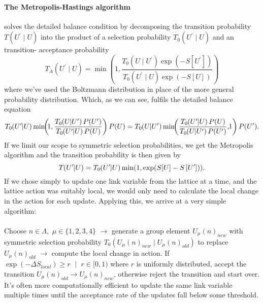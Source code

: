 \documentclass[a4paper,10pt]{book}
\begin{document}
\paragraph{The Metropolis-Hastings algorithm} solves the detailed balance condition by decomposing the transition probability $T\left(U^{\prime} \mid U\right)$ into the product of a selection probability $T_0\left(U^{\prime} \mid U\right)$ and an transition- acceptance probability
\begin{equation}
T_{A}\left(U^{\prime} \mid U\right)=\min \left(1, \frac{T_{0}\left(U \mid U^{\prime}\right) \exp \left(-S\left[U^{\prime}\right]\right)}{T_{0}\left(U^{\prime} \mid U\right) \exp (-S[U])}\right)
\end{equation}
where we've used the Boltzmann distribution in place of the more general probability distribution. Which, as we can see, fulfils the detailed balance equation
\begin{equation*}
T_0\mkern-4mu\left(U^{\prime}\mkern-6mu \mid\mkern-5mu U\right)\min\mkern-6mu \left(\mkern-4mu 1, \frac{T_0\mkern-4mu\left(U\mkern-6mu \mid\mkern-5mu U^{\prime}\right) P(U^\prime)}{T_0\mkern-4mu\left(U^{\prime}\mkern-6mu \mid\mkern-5mu U\right) P(U)}\right)P(U) = T_0\mkern-4mu\left(U\mkern-6mu \mid\mkern-5mu U^{\prime}\right)\min\mkern-6mu \left(\frac{T_0\mkern-4mu\left(U^{\prime}\mkern-6mu \mid\mkern-5mu U\right) P(U)}{T_0\mkern-4mu\left(U\mkern-6mu \mid\mkern-5mu U^{\prime}\right) P(U^{\prime})},\mkern-4mu 1\right)P(U^{\prime}).
\end{equation*}
If we limit our scope to symmetric selection probabilities, we get the Metropolis algorithm and the transition probability is then given by 
\begin{equation}
T\mkern-4mu\left(U^{\prime}\mkern-6mu \mid\mkern-5mu U\right) = T_0\mkern-4mu\left(U^{\prime}\mkern-6mu \mid\mkern-5mu U\right)\min (1, \exp (S[U]-S\left[U^{\prime}\right])).
\end{equation}
If we chose simply to update one link variable from the lattice at a time, and the lattice action was suitably local, we would only need to calculate the local change in the action for each update. Applying this, we arrive at a very simple algorithm:\\\\Choose $n\in\Lambda,\,\,\mu \in\{1,2,3,4\}$ $\rightarrow$ generate a group element $U_\mu(n)_{new}$ with symmetric selection probability $T_0\left( U_\mu(n)_{new} \mid U_\mu(n)_{old} \right)$ to replace $U_\mu(n)_{old}$ $\rightarrow$ compute the local change in action. If $\exp (-\Delta S_{local})\geq r\,\,\mid\,\,r\in[0,1)$ where $r$ is uniformly distributed, accept the transition $U_\mu(n)_{old} \rightarrow U_\mu(n)_{new}$, otherwise reject the transition and start over.\\It's often more computationally efficient to update the same link variable multiple times until the acceptance rate of the updates fall below some threshold.
\end{document}
